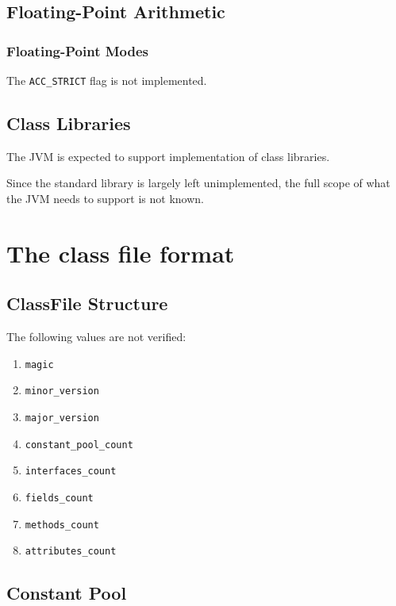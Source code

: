 \addtocounter{subsection}{7}
\subsection{Floating-Point Arithmetic}
\subsubsection{Floating-Point Modes}

The \texttt{ACC\_STRICT} flag is not implemented.

\addtocounter{subsection}{3}

\subsection{Class Libraries}

The JVM is expected to support implementation of class libraries.

Since the standard library is largely left unimplemented, the full scope of what the JVM needs to support is not known.

\section{The class file format}

\subsection{ClassFile Structure}

The following values are not verified:

\begin{enumerate}
\item \texttt{magic}
\item \texttt{minor\_version}
\item \texttt{major\_version}
\item \texttt{constant\_pool\_count}
\item \texttt{interfaces\_count}
\item \texttt{fields\_count}
\item \texttt{methods\_count}
\item \texttt{attributes\_count}
\end{enumerate}

\addtocounter{subsection}{2}
\subsection{Constant Pool}

